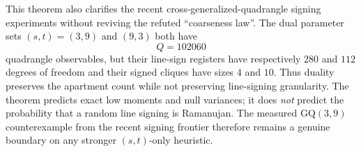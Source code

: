 This theorem also clarifies the recent cross-generalized-quadrangle signing
experiments without reviving the refuted ``coarseness law''.  The dual parameter
sets $(s,t)=(3,9)$ and $(9,3)$ both have
\[
 \boxed{Q=102060}
\]
quadrangle observables, but their line-sign registers have respectively $280$
and $112$ degrees of freedom and their signed cliques have sizes $4$ and $10$.
Thus duality preserves the apartment count while not preserving line-signing
granularity.  The theorem predicts exact low moments and null variances; it does
\emph{not} predict the probability that a random line signing is Ramanujan.
The measured $\mathrm{GQ}(3,9)$ counterexample from the recent signing frontier
therefore remains a genuine boundary on any stronger $(s,t)$-only heuristic.

\begin{center}
\end{center}

%
